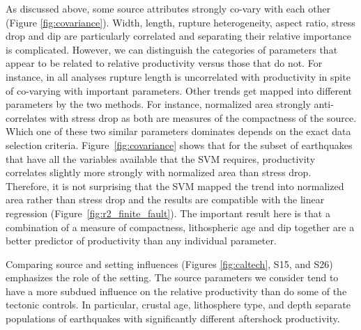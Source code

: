 \documentclass[draft, jgrga]{agujournal2018}
\begin{document}

As discussed above, some source attributes strongly co-vary with each other (Figure \ref{fig:covariance}). Width, length, rupture heterogeneity, aspect ratio, stress drop and dip are particularly correlated and separating their relative importance is complicated. However, we can distinguish the categories of parameters that appear to be related to relative productivity versus those that do not. For instance, in all analyses rupture length is uncorrelated with productivity in spite of co-varying with important parameters. Other trends get mapped into different parameters by the two methods. For instance, normalized area strongly anti-correlates with stress drop as both are measures of the compactness of the source. Which one of these two similar parameters dominates depends on the exact data selection criteria. Figure~\ref{fig:covariance} shows that for the subset of earthquakes that have all the variables available that the SVM requires, productivity correlates slightly more strongly with normalized area than stress drop. Therefore, it is not surprising that the SVM mapped the trend into normalized area rather than stress drop and the results are compatible with the linear regression (Figure~\ref{fig:r2_finite_fault}). The important result here is that a combination of a measure of compactness, lithospheric age and dip together are a better predictor of productivity than any individual parameter.


Comparing source and setting influences (Figures \ref{fig:caltech}, S15, and S26) emphasizes the role of the setting. The source parameters we consider tend to have a more subdued influence on the relative productivity than do some of the tectonic controls. In particular, crustal age, lithosphere type, and depth separate populations of earthquakes with significantly different aftershock productivity.
\end{document}
